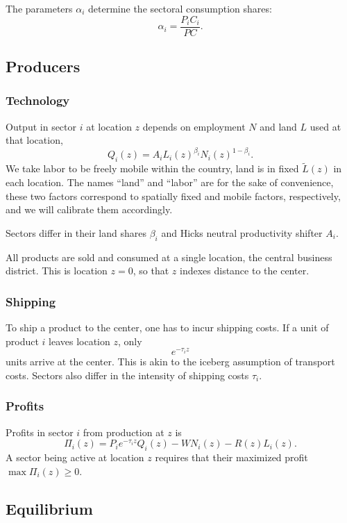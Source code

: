 \documentclass[12pt]{article}
\begin{document}
The parameters $\alpha_i$ determine the sectoral consumption shares:
\begin{equation*}
\alpha_i=\frac{P_iC_i}{PC}.
\end{equation*}

\subsection{Producers}
\subsubsection{Technology}
Output in sector $i$ at location $z$ depends on employment $N$ and land $L$ used at that location,
\[
Q_i(z) = A_i L_i(z)^{\beta_i}N_i(z)^{1-\beta_i}.
\]
We take labor to be freely mobile within the country, land is in fixed $\tilde{L}(z)$ in each location. The names ``land'' and ``labor'' are for the sake of convenience, these two factors correspond to spatially fixed and mobile factors, respectively, and we will calibrate them accordingly.

Sectors differ in their land shares $\beta_i$ and Hicks neutral productivity shifter $A_i$.

All products are sold and consumed at a single location, the central business district. This is location $z=0$, so that $z$ indexes distance to the center.

\subsubsection{Shipping}
To ship a product to the center, one has to incur shipping costs. If a unit of product $i$ leaves location $z$, only
\[
e^{-\tau_i z}
\]
units arrive at the center. This is akin to the iceberg assumption of transport costs. Sectors also differ in the intensity of shipping costs $\tau_i$.

\subsubsection{Profits}
Profits in sector $i$ from production at $z$ is
\begin{equation}
\label{eq:profit}
\Pi_i(z)=P_ie^{-\tau_iz}Q_i(z)-WN_i(z)-R(z)L_i(z).
\end{equation}
A sector being active at location $z$ requires that their maximized profit $\max\Pi_i(z)\geq0.$

\subsection{Equilibrium}
\end{document}
